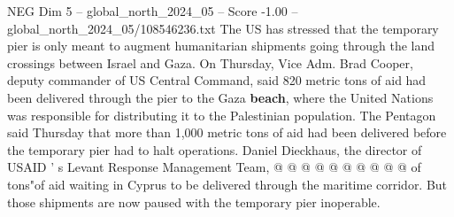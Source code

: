 \begin{textsample}{NEG Dim 5 – global\_north\_2024\_05 – Score -1.00 – global\_north\_2024\_05/108546236.txt}
The US has stressed that the temporary pier is only meant to augment humanitarian shipments going through the land crossings between Israel and Gaza.
On Thursday, Vice Adm.
Brad Cooper, deputy commander of US Central Command, said 820 metric tons of aid had been delivered through the pier to the Gaza \textbf{beach}, where the United Nations was responsible for distributing it to the Palestinian population.
The Pentagon said Thursday that more than 1,000 metric tons of aid had been delivered before the temporary pier had to halt operations.
Daniel Dieckhaus, the director of USAID ' s Levant Response Management Team, @ @ @ @ @ @ @ @ @ @ of tons"of aid waiting in Cyprus to be delivered through the maritime corridor.
But those shipments are now paused with the temporary pier inoperable.

\end{textsample}

